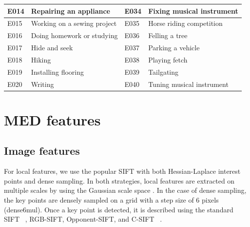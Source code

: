 \begin{table}
\begin{tabular}{@{}|c|l|l|l|@{}}
		\multicolumn{1}{|l|}{E014} & Repairing an appliance                   & E034        & Fixing musical instrument         \\ \midrule
		\multicolumn{1}{|l|}{E015} & Working on a sewing project              & E035        & Horse riding competition          \\ \midrule
		\multicolumn{1}{|l|}{E016} & Doing homework or studying               & E036        & Felling a tree                    \\ \midrule
		\multicolumn{1}{|l|}{E017} & Hide and seek                            & E037        & Parking a vehicle                 \\ \midrule
		\multicolumn{1}{|l|}{E018} & Hiking                                   & E038        & Playing fetch                     \\ \midrule
		\multicolumn{1}{|l|}{E019} & Installing flooring                      & E039        & Tailgating                        \\ \midrule
		\multicolumn{1}{|l|}{E020} & Writing                                  & E040        & Tuning musical instrument         \\ \bottomrule
	\end{tabular}
	\label{c2_eventlist}
\end{table}

\section{MED features}
\label{c2_sec_med_feature}
\subsection{Image features}
For local features, we use the popular SIFT with both Hessian-Laplace interest points \cite{mikolajczyk2002affine} and dense sampling. In both strategies, local features are extracted on multiple scales by using the Gaussian scale space \cite{mikolajczyk2002affine}. In the case of dense sampling, the key points are densely sampled on a grid with a step size of 6 pixels (dense6mul). Once a key point is detected, it is described using the standard SIFT ~\cite{lowe2004distinctive}, RGB-SIFT, Opponent-SIFT, and C-SIFT ~\cite{burghouts2009performance}.

